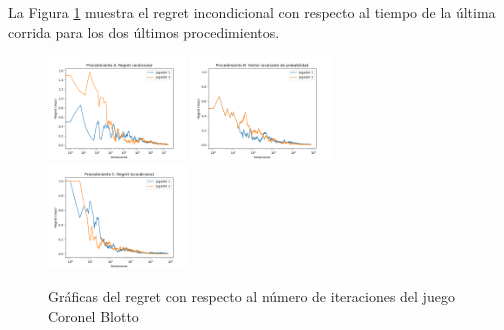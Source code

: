  La Figura \ref{fig:regret-coronel-blotto} muestra el regret incondicional con respecto al tiempo de la última corrida para los dos últimos procedimientos.
 
\begin{figure}[ht]
\caption{Gráficas del regret con respecto al número de iteraciones del juego Coronel Blotto}
\label{fig:regret-coronel-blotto}
\centering
\includegraphics[width=0.327\textwidth]{graficas/coronel-blotto/procedimiento-A.png}
\includegraphics[width=0.327\textwidth]{graficas/coronel-blotto/procedimiento-B.png}
\includegraphics[width=0.327\textwidth]{graficas/coronel-blotto/procedimiento-C.png}
\end{figure}
\newpage